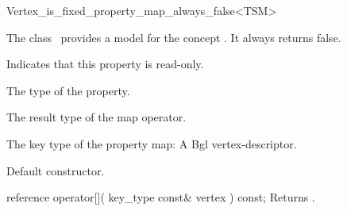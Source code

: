 

\begin{ccRefClass}{Vertex_is_fixed_property_map_always_false<TSM>}


\ccDefinition

The class \ccRefName\ provides a model for the concept .
It always returns false.


\ccTypes
    {Indicates that this property is read-only.}
  
    {The type of the property.}
    
    {The result type of the map operator.}

  {The key type of the property map: A {\sc Bgl vertex-descriptor.}}

\ccCreation
{}  %

{Default constructor.}

\ccOperations

\ccMethod
  {reference operator[]( key_type const& vertex ) const;}
  {Returns .}  
    
\ccIsModel
{}

\ccSeeAlso
{}\\

\end{ccRefClass}


